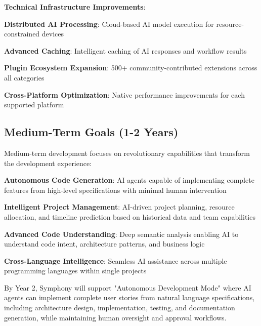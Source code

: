 \textbf{Technical Infrastructure Improvements}:
\begin{compactlist}
    \item \textbf{Distributed AI Processing}: Cloud-based AI model execution for resource-constrained devices
    \item \textbf{Advanced Caching}: Intelligent caching of AI responses and workflow results
    \item \textbf{Plugin Ecosystem Expansion}: 500+ community-contributed extensions across all categories
    \item \textbf{Cross-Platform Optimization}: Native performance improvements for each supported platform
\end{compactlist}

\subsection*{Medium-Term Goals (1-2 Years)}

Medium-term development focuses on revolutionary capabilities that transform the development experience:

\begin{expandedlist}
    \item \textbf{Autonomous Code Generation}: AI agents capable of implementing complete features from high-level specifications with minimal human intervention
    \item \textbf{Intelligent Project Management}: AI-driven project planning, resource allocation, and timeline prediction based on historical data and team capabilities
    \item \textbf{Advanced Code Understanding}: Deep semantic analysis enabling AI to understand code intent, architecture patterns, and business logic
    \item \textbf{Cross-Language Intelligence}: Seamless AI assistance across multiple programming languages within single projects
\end{expandedlist}

\begin{infobox}[title=Revolutionary Capability: Autonomous Development]
By Year 2, Symphony will support "Autonomous Development Mode" where AI agents can implement complete user stories from natural language specifications, including architecture design, implementation, testing, and documentation generation, while maintaining human oversight and approval workflows.
\end{infobox}

